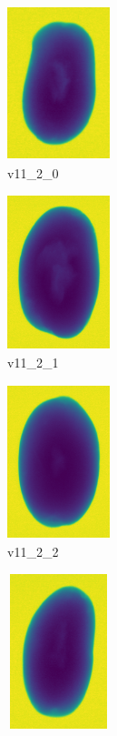 \documentclass[11pt]{article}
\begin{document}
\begin{figure}
     \centering
     \begin{subfigure}[b]{0.15\textwidth}
         \centering
         \includegraphics[width=3cm, height=4.5cm]{images/kartofler/v11_2_0_cut.png}
         \caption{v11\_2\_0}
         \label{fig:y equals x}
     \end{subfigure}
     \hfill
     \begin{subfigure}[b]{0.15\textwidth}
         \centering
         \includegraphics[width=3cm, height=4.5cm]{images/kartofler/v11_2_1_cut.png}
        \caption{v11\_2\_1}
         \label{fig:three sin x}
     \end{subfigure}
     \hfill
     \begin{subfigure}[b]{0.15\textwidth}
         \centering
         \includegraphics[width=3cm, height=4.5cm]{images/kartofler/v11_2_2_cut.png}
        \caption{v11\_2\_2}
         \label{fig:five over x}
     \end{subfigure}
     \hfill
    \begin{subfigure}[b]{0.15\textwidth}
         \centering
         \includegraphics[width=3cm, height=4.5cm]{images/kartofler/v11_2_3_cut.png}

\end{subfigure}
\end{figure}
\end{document}
